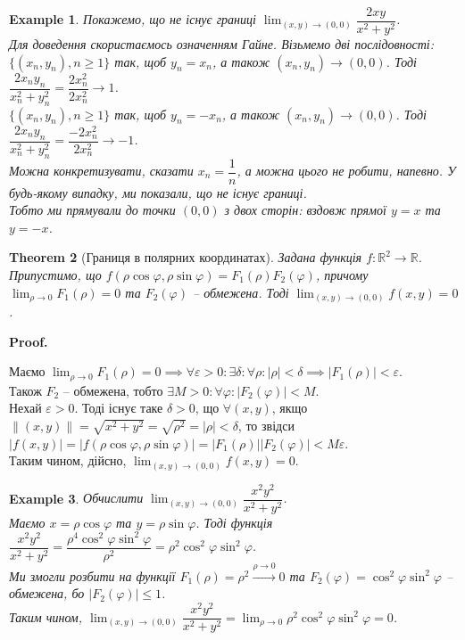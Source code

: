 \documentclass[a4paper, 10pt]{article}
\makeatletter
\def\huge{\displaystyle}
\theoremstyle{theoremdd}
\newtheorem{theorem}{Theorem}[subsection]
\theoremstyle{theoremdd}
\theoremstyle{theoremdd}
\theoremstyle{theoremdd}
\theoremstyle{theoremdd}
\newtheorem{example}[theorem]{Example}
\theoremstyle{theoremdd}
\theoremstyle{theoremdd}
\theoremstyle{theoremdd}
\theoremstyle{theoremdd}
\renewenvironment{proof}[1][Proof.\\]{\par
\pushQED{\hfill \qed}%
\normalfont \topsep6\p@\@plus6\p@\relax
\trivlist
\item\relax
{\bfseries
#1\@addpunct{.}}\hspace\labelsep\ignorespaces
}{%
\popQED\endtrivlist\@endpefalse
}
\newcommand\Norm[1]{\|#1\|}
\makeatother
\begin{document}
\begin{example}
Покажемо, що не існує границі $\displaystyle\lim_{(x,y) \to (0,0)} \dfrac{2xy}{x^2+y^2}$.\\
Для доведення скористаємось означенням Гайне. Візьмемо дві послідовності:\\
$\{(x_n,y_n), n \geq 1\}$ так, щоб $y_n = x_n$, а також $(x_n,y_n) \to (0,0)$. Тоді $\dfrac{2x_n y_n}{x_n^2+y_n^2} = \dfrac{2x_n^2}{2x_n^2} \to 1$.\\
$\{(x_n,y_n), n \geq 1\}$ так, щоб $y_n = -x_n$, а також $(x_n,y_n) \to (0,0)$. Тоді $\dfrac{2x_n y_n}{x_n^2+y_n^2} = \dfrac{-2x_n^2}{2x_n^2} \to -1$.\\
Можна конкретизувати, сказати $x_n = \dfrac{1}{n}$, а можна цього не робити, напевно. У будь-якому випадку, ми показали, що не існує границі.\\
Тобто ми прямували до точки $(0,0)$ з двох сторін: вздовж прямої $y = x$ та $y = -x$.
\end{example}

\begin{theorem}[Границя в полярних координатах]
Задана функція $f \colon \mathbb{R}^2 \to \mathbb{R}$. Припустимо, що $f(\rho \cos \varphi, \rho \sin \varphi) = F_1(\rho) F_2(\varphi)$, причому $\huge\lim_{\rho \to 0} F_1(\rho) = 0$ та $F_2(\varphi)$ -- обмежена. Тоді $\huge\lim_{(x,y) \to (0,0)} f(x,y) = 0$.
\end{theorem}

\begin{proof}
Маємо $\huge\lim_{\rho \to 0} F_1(\rho) = 0 \implies \forall \varepsilon > 0: \exists \delta: \forall \rho: |\rho| < \delta \implies |F_1(\rho)| < \varepsilon$.\\
Також $F_2$ -- обмежена, тобто $\exists M>0: \forall \varphi: |F_2(\varphi)| < M$.\\
Нехай $\varepsilon > 0$. Тоді існує таке $\delta > 0$, що $\forall (x,y)$, якщо $\Norm{(x,y)} = \sqrt{x^2+y^2} = \sqrt{\rho^2} = |\rho| < \delta$, то звідси $|f(x,y)| = |f(\rho \cos \varphi, \rho \sin \varphi)| = |F_1(\rho)| |F_2(\varphi)| < M\varepsilon$.\\
Таким чином, дійсно, $\huge\lim_{(x,y) \to (0,0)} f(x,y) = 0$.
\end{proof}

\begin{example}
Обчислити $\huge\lim_{(x,y) \to (0,0)} \dfrac{x^2y^2}{x^2+y^2}$.\\
Маємо $x = \rho \cos \varphi$ та $y = \rho \sin \varphi$. Тоді функція $\dfrac{x^2y^2}{x^2+y^2} = \dfrac{\rho^4 \cos^2 \varphi \sin^2 \varphi}{\rho^2} = \rho^2 \cos^2 \varphi \sin^2 \varphi$.\\
Ми змогли розбити на функції $F_1(\rho) = \rho^2 \overset{\rho \to 0}{\longrightarrow} 0$ та $F_2(\varphi) = \cos^2 \varphi \sin^2 \varphi$ -- обмежена, бо $|F_2(\varphi)| \leq 1$.\\
Таким чином, $\huge\lim_{(x,y) \to (0,0)} \dfrac{x^2y^2}{x^2+y^2} = \lim_{\rho \to 0} \rho^2 \cos^2 \varphi \sin^2 \varphi = 0$.
\end{example}
\end{document}
